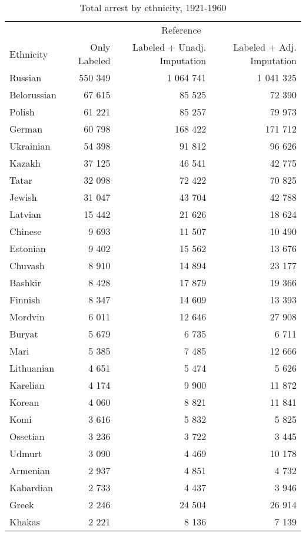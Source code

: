 \begin{table}[!h]

\caption{\label{tab:total_arrests_by_ethnicity}Total arrest by ethnicity, 1921-1960}
\centering
\fontsize{8}{10}\selectfont
\begin{tabular}{lrrr}
\toprule
\multicolumn{1}{c}{ } & \multicolumn{3}{c}{Reference} \\
\cmidrule(l{2pt}r{2pt}){2-4}
Ethnicity & Only Labeled & Labeled + Unadj. Imputation & Labeled + Adj. Imputation\\
\midrule
Russian & 550 349 & 1 064 741 & 1 041 325\\
Belorussian & 67 615 & 85 525 & 72 390\\
Polish & 61 221 & 85 257 & 79 973\\
German & 60 798 & 168 422 & 171 712\\
Ukrainian & 54 398 & 91 812 & 96 626\\
Kazakh & 37 125 & 46 541 & 42 775\\
Tatar & 32 098 & 72 422 & 70 825\\
Jewish & 31 047 & 43 704 & 42 788\\
Latvian & 15 442 & 21 626 & 18 624\\
Chinese & 9 693 & 11 507 & 10 490\\
Estonian & 9 402 & 15 562 & 13 676\\
Chuvash & 8 910 & 14 894 & 23 177\\
Bashkir & 8 428 & 17 879 & 19 366\\
Finnish & 8 347 & 14 609 & 13 393\\
Mordvin & 6 011 & 12 646 & 27 908\\
Buryat & 5 679 & 6 735 & 6 711\\
Mari & 5 385 & 7 485 & 12 666\\
Lithuanian & 4 651 & 5 474 & 5 626\\
Karelian & 4 174 & 9 900 & 11 872\\
Korean & 4 060 & 8 821 & 11 841\\
Komi & 3 616 & 5 832 & 5 825\\
Ossetian & 3 236 & 3 722 & 3 445\\
Udmurt & 3 090 & 4 469 & 10 178\\
Armenian & 2 937 & 4 851 & 4 732\\
Kabardian & 2 733 & 4 437 & 3 946\\
Greek & 2 246 & 24 504 & 26 914\\
Khakas & 2 221 & 8 136 & 7 139\\

\end{tabular}
\end{table}
